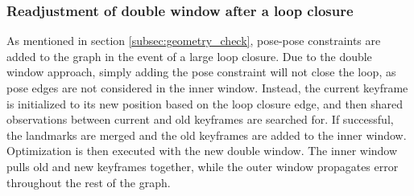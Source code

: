 \subsubsection{Readjustment of double window after a loop closure}
As mentioned in section \ref{subsec:geometry_check}, pose-pose constraints are added to the graph in the event of a large loop closure. Due to the double window approach, simply adding the pose constraint will not close the loop, as pose edges are not considered in the inner window.  Instead, the current keyframe is initialized to its new position based on the loop closure edge, and then shared observations between current and old keyframes are searched for.  If successful, the landmarks are merged and the old keyframes are added to the inner window.  Optimization is then executed with the new double window.  The inner window pulls old and new keyframes together, while the outer window propagates error throughout the rest of the graph.


%
